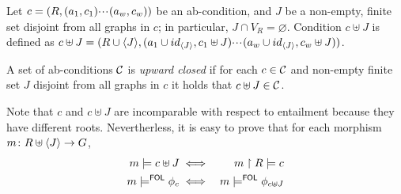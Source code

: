 \begin{definition}
  \label{def:adding-nodes-to-condition}
  Let $c = (R,(a_1,c_1){\cdotp\mkern-2mu\cdotp\mkern-2mu\cdotp\mkern1mu} (a_w,c_w))$ be an ab-condition, and $J$ be a non-empty, finite set disjoint from all graphs in $c$; in particular, $J \cap V_R = \varnothing$. Condition $c \uplus J$ is defined as $c \uplus J = (R \cup \langle J \rangle, (a_1 \cup id_{\langle J \rangle}, c_1 \uplus J){\cdotp\mkern-2mu\cdotp\mkern-2mu\cdotp\mkern1mu}(a_w \cup id_{\langle J \rangle}, c_w \uplus J))$. 

  A set of ab-conditions $\mathcal{C}$ is \emph{upward closed} if for each $c \in \mathcal{C}$ and non-empty finite set $J$ disjoint from all graphs in $c$ it holds that $c \uplus J \in \mathcal{C}$.  
\end{definition}

Note that $c$ and $c \uplus J$ are incomparable with respect to entailment because they have different roots. Nevertherless, it is easy to prove that  
for each morphism $m \colon R \uplus \langle J \rangle \rightarrow G$,
\begin{eqnarray}
m \sat c \uplus J & \iff & m \restr R \sat c \eqlabel{eq:modRestricted}\\
m\sat^\FOL \phi_c & \iff & m \sat^\FOL \phi_{c\uplus J} \eqlabel{eq:condExpanded}
\end{eqnarray}

